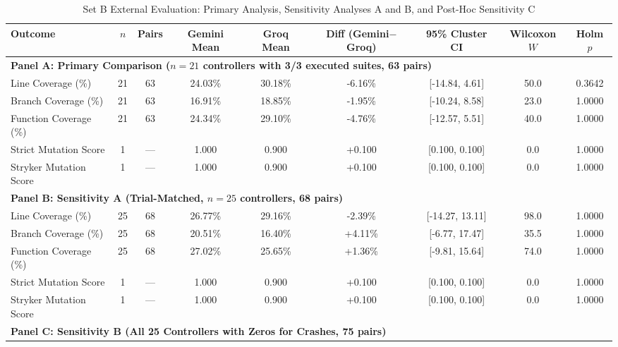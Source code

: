 \begin{table}[t]
\centering
\caption{Set B External Evaluation: Primary Analysis, Sensitivity Analyses A and B, and Post-Hoc Sensitivity C}
\label{tab:setb_comparison}
\begin{tabular}{lcccccccc}
\toprule
\textbf{Outcome} & \textbf{$n$} & \textbf{Pairs} & \textbf{Gemini Mean} & \textbf{Groq Mean} & \textbf{Diff (Gemini$-$Groq)} & \textbf{95\% Cluster CI} & \textbf{Wilcoxon $W$} & \textbf{Holm $p$} \\
\midrule
\multicolumn{9}{l}{\textbf{Panel A: Primary Comparison ($n=21$ controllers with 3/3 executed suites, 63 pairs)}} \\
\midrule
Line Coverage (\%) & 21 & 63 & 24.03\% & 30.18\% & -6.16\% & [-14.84, 4.61] & 50.0 & 0.3642 \\
Branch Coverage (\%) & 21 & 63 & 16.91\% & 18.85\% & -1.95\% & [-10.24, 8.58] & 23.0 & 1.0000 \\
Function Coverage (\%) & 21 & 63 & 24.34\% & 29.10\% & -4.76\% & [-12.57, 5.51] & 40.0 & 1.0000 \\
Strict Mutation Score & 1 & --- & 1.000 & 0.900 & +0.100 & [0.100, 0.100] & 0.0 & 1.0000 \\
Stryker Mutation Score & 1 & --- & 1.000 & 0.900 & +0.100 & [0.100, 0.100] & 0.0 & 1.0000 \\
\midrule
\multicolumn{9}{l}{\textbf{Panel B: Sensitivity A (Trial-Matched, $n=25$ controllers, 68 pairs)}} \\
\midrule
Line Coverage (\%) & 25 & 68 & 26.77\% & 29.16\% & -2.39\% & [-14.27, 13.11] & 98.0 & 1.0000 \\
Branch Coverage (\%) & 25 & 68 & 20.51\% & 16.40\% & +4.11\% & [-6.77, 17.47] & 35.5 & 1.0000 \\
Function Coverage (\%) & 25 & 68 & 27.02\% & 25.65\% & +1.36\% & [-9.81, 15.64] & 74.0 & 1.0000 \\
Strict Mutation Score & 1 & --- & 1.000 & 0.900 & +0.100 & [0.100, 0.100] & 0.0 & 1.0000 \\
Stryker Mutation Score & 1 & --- & 1.000 & 0.900 & +0.100 & [0.100, 0.100] & 0.0 & 1.0000 \\
\midrule
\multicolumn{9}{l}{\textbf{Panel C: Sensitivity B (All 25 Controllers with Zeros for Crashes, 75 pairs)}} \\

\end{tabular}
\end{table}
